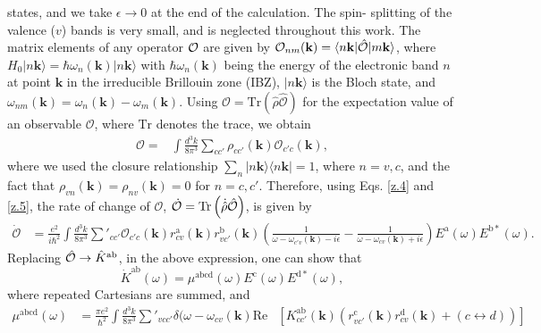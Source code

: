 \documentclass[floatfix,prb,aps,superscriptaddress,showpacs,11pt,preprint,letterpaper]{revtex4}
\begin{document}
states, and we take $\epsilon\to 0$ at the end of the calculation.  The spin-
splitting of the valence ($v$) bands is very small, and is neglected throughout
this work.\cite{nastosPRB07} The matrix elements of any operator ${\cal O}$ are
given by ${\cal O}_{nm}({\mathbf k})=\langle n{\mathbf k}|\hat{\cal O}|
m{\mathbf k}\rangle$, where $H_{0}|n{\mathbf k}\rangle = \hbar
\omega_{n}({\mathbf k})|n{\mathbf k}\rangle$ with $\hbar \omega_{n}({\mathbf
k})$ being the energy of the electronic band $n$ at point ${\mathbf k}$ in the
irreducible Brillouin zone (IBZ),  $|n{\mathbf k}\rangle$ is the Bloch state,
and $\omega_{nm}({\mathbf k})=\omega_{n}({\mathbf k})-\omega_{m}({\mathbf k})$.
Using $\mathcal{O} = \mathrm{Tr}(\hat{\rho}\hat{\mathcal{O}})$ for the
expectation value of an observable $\mathcal{O}$, where $\mathrm{Tr}$ denotes
the trace, we obtain
\begin{align}\label{z.5}
\mathcal{O} = & 
\int \frac{d^{3}k}{8\pi^{3}} \sum_{cc'} \rho_{cc'}({\mathbf k}) 
\mathcal{O}_{c'c}({\mathbf k}),
\end{align}
where we used the closure relationship $\sum_{n}|n{\mathbf k}\rangle \langle
n{\mathbf k}| = 1$, where $n=v,c$, and the fact that $\rho_{vn}({\mathbf
k})=\rho_{nv}({\mathbf k})=0$ for $n=c,c'$. Therefore, using  Eqs. \eqref{z.4}
and \eqref{z.5}, the rate of change of $\mathcal{O}$, $\dot{\mathcal{O}} =
\mathrm{Tr} \left( \dot{\hat\rho} \hat{\cal O} \right)$, is given by
\begin{align}
\dot{\mathcal{O}} &=
\frac{e^{2}}{i\hbar^{2}} \int \frac{d^{3}k}{8\pi^{3}} 
\sum'_{cc'} \mathcal{O}_{c'c}({\mathbf k}) 
r^{\mathrm{a}}_{cv}({\mathbf k})  r^{\mathrm{b}}_{vc'}({\mathbf k})  
\left( \frac{1}{\omega - \omega_{c'v}({\mathbf k})  - i\epsilon} - 
\frac{1}{\omega - \omega_{cv}({\mathbf k})  + i\epsilon} \right)
E^{\mathrm{a}}(\omega) E^{\mathrm{b*}}(\omega)
\label{eq:dotO}
.
\end{align}
Replacing $\hat{\cal O} \rightarrow \hat{K}^{\mathrm{ab}}$, in the above
expression, one can show that
\begin{equation}
\dot{K}^{\mathrm{ab}}(\omega) = \mu^{\mathrm{abcd}}(\omega)
E^{\mathrm{c}}(\omega) E^{\mathrm{d*}}(\omega),
\label{eq:dotk}
\end{equation}
where repeated Cartesians are summed, and 
\begin{equation}\label{eq:mu}
\begin{aligned}
\mu^{\mathrm{abcd}}  (\omega) &
=
\frac{\pi e^{2}}{\hbar^{2}} \int 
\frac{d^{3}k}{8 \pi^{3}} \sum'_{vcc'}
\delta(\omega-\omega_{cv}({\mathbf k}) 
\mathrm{Re} & \left[ K^{\mathrm{ab}}_{cc'}({\mathbf k}) 
\left(  
r^{\mathrm{c}}_{vc'}({\mathbf k})   
r^{\mathrm{d}}_{cv }({\mathbf k})  +
(c \leftrightarrow d)  
\right) 
\right]
\end{aligned}
\end{equation} 
\end{document}
